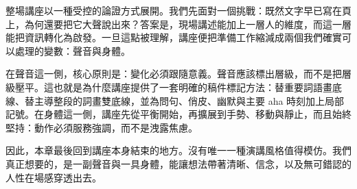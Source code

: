 整場講座以一種受控的論證方式展開。我們先面對一個挑戰：既然文字早已寫在頁上，為何還要把它大聲說出來？答案是，現場講述能加上一層人的維度，而這一層能把資訊轉化為啟發。一旦這點被理解，講座便把準備工作縮減成兩個我們確實可以處理的變數：聲音與身體。

在聲音這一側，核心原則是：變化必須跟隨意義。聲音應該標出層級，而不是把層級壓平。這也就是為什麼講座提供了一套明確的稿件標記方法：替重要詞語畫底線、替主導整段的詞畫雙底線，並為問句、俏皮、幽默與主要 aha 時刻加上局部記號。在身體這一側，講座先從平衡開始，再擴展到手勢、移動與靜止，而且始終堅持：動作必須服務強調，而不是洩露焦慮。

因此，本章最後回到講座本身結束的地方。沒有唯一一種演講風格值得模仿。我們真正想要的，是一副聲音與一具身體，能讓想法帶著清晰、信念，以及無可錯認的人性在場感穿透出去。